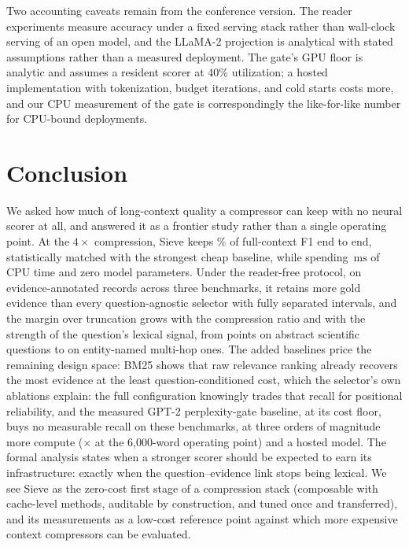 \documentclass[review,12pt]{elsarticle}
\theoremstyle{remark}
\newcommand{\method}{Sieve}
\newcommand{\ms}{\ensuremath{\mathrm{ms}}}
\begin{document}
Two accounting caveats remain from the conference version. The reader
experiments measure accuracy under a fixed serving stack rather than
wall-clock serving of an open model, and the LLaMA-2 projection is
analytical with stated assumptions rather than a measured deployment.
The gate's GPU floor is analytic and assumes a resident scorer at 40\%
utilization; a hosted implementation with tokenization, budget
iterations, and cold starts costs more, and our CPU measurement of
the gate is correspondingly the like-for-like number for CPU-bound
deployments.

\section{Conclusion}
\label{sec:conclusion}
We asked how much of long-context quality a compressor can keep with
no neural scorer at all, and answered it as a frontier study rather
than a single operating point. At the $4\times$ compression,
\method{} keeps \QASieRetain\% of full-context F1 end to end,
statistically matched with the strongest cheap baseline, while
spending \TimeSieSixk\,\ms{} of CPU time and zero model parameters.
Under the reader-free protocol, on \TotalRecords{}
evidence-annotated records across three benchmarks, it retains more
gold evidence than every question-agnostic selector with fully
separated intervals, and the margin over truncation grows with the
compression ratio and with the strength of the question's lexical
signal, from \PairQSH{} points on abstract scientific questions to
\PairHSH{} on entity-named multi-hop ones. The added baselines price
the remaining design space: BM25 shows that raw relevance ranking
already recovers the most evidence at the least
question-conditioned cost, which the selector's own ablations explain:
the full configuration knowingly trades that recall for
positional reliability, and the measured GPT-2 perplexity-gate
baseline, at its cost floor, buys no
measurable recall on these benchmarks, at three orders of magnitude
more compute (\GateSieRatioSixk$\times$ at the 6{,}000-word operating
point) and a hosted model. The formal analysis states when a stronger
scorer should be expected to earn its infrastructure: exactly when the
question--evidence link stops being lexical. We see \method{} as the
zero-cost first stage of a compression stack (composable with
cache-level methods, auditable by construction, and tuned once and
transferred), and its measurements as a low-cost reference point
against which more expensive context compressors can be evaluated.
\end{document}

